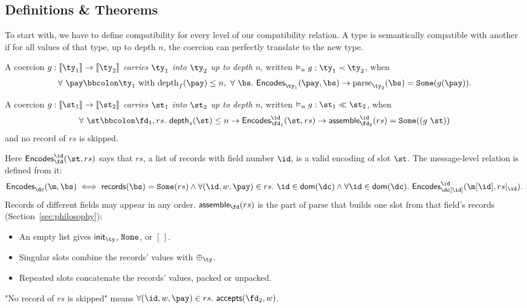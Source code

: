 \subsection{Definitions \& Theorems}

To start with, we have to define compatibility for every level of our
compatibility relation. A type is semantically compatible with another if for
all values of that type, up to depth $n$, the coercion can perfectly translate
to the new type.

\vspace{1em}
\begin{definition}\label{def:sem-compat-typ}
  A coercion $g : \denote{\ty_1} \rightarrow \denote{\ty_2}$ \emph{carries
    $\ty_1$ into $\ty_2$ up to depth $n$}, written
  $\semjudg[n]{g : \ty_1 \typrel \ty_2}$, when
  \[ \forall\ \validv{\pay}{\ty_1} \text{ with } \mathrm{depth}_f(\pay) \le n,\
    \forall\ \bs.\ \encodes{\ty_1}(\pay, \bs) \rightarrow
    \mathrm{parse}_{\ty_2}(\bs) = \some{g(\pay)}. \]
\end{definition}

\vspace{1em}
\begin{definition}\label{def:sem-compat-fld}
  A coercion $g : \denote{\st_1} \rightarrow \denote{\st_2}$ \emph{carries $\st_1$ into $\st_2$ up
  to depth $n$}, written $\semjudg[n]{g : \st_1 \dcompat \st_2}$, when
\[ \forall\ \validv{\st}{\fd_1}, rs.\ \sdepth(\st) \le n \rightarrow \encodes[\id]{\fd_1}(\st, rs) \rightarrow
  \assemble_{\fd_2}^{\id}(rs) = \some{(g\ \st)} \]
and no record of $rs$ is skipped.
\end{definition}

Here $\encodes[\id]{\fd}(\st, rs)$ says that $rs$, a list of records with field
number $\id$, is a valid encoding of slot $\st$. The message-level relation is
defined from it:
\[
  \encodes{\dc}(\m, \bs) \iff
  \records(\bs) = \some{rs}
  \wedge \forall (\id, w, \pay) \in rs.\ \id \in \dom{\dc}
  \wedge \forall \id \in \dom{\dc}.\ \encodes[\id]{\dc[\id]}(\m[\id], \restr{rs}{\id}).
\]
Records of different fields may appear in any order. $\assemble_{\fd}(rs)$ is the
part of $\mathrm{parse}$ that builds one slot from that field's records
(Section~\ref{sec:philosophy}):
\begin{itemize}
\item An empty list gives $\init_{\ty}$, $\mathtt{None}$, or $[\,]$.
\item Singular slots combine the records' values with $\combine{\ty}$.
\item Repeated slots concatenate the records' values, packed or unpacked.
\end{itemize}
"No record of $rs$ is skipped" means
$\forall (\id, w, \pay) \in rs.\ \accepts(\fd_2, w)$.

